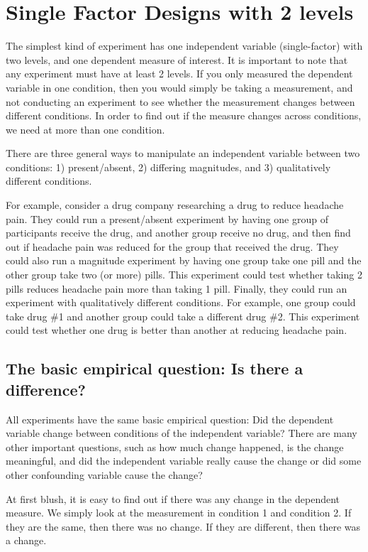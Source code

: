 \section{Single Factor Designs with 2 levels}

The simplest kind of experiment has one independent variable (single-factor) with two levels, and one dependent measure of interest. It is important to note that any experiment must have at least 2 levels. If you only measured the dependent variable in one condition, then you would simply be taking a measurement, and not conducting an experiment to see whether the measurement changes between different conditions. In order to find out if the measure changes across conditions, we need at more than one condition.

There are three general ways to manipulate an independent variable between two conditions: 1) present/absent, 2) differing magnitudes, and 3) qualitatively different conditions.

For example, consider a drug company researching a drug to reduce headache pain. They could run a present/absent experiment by having one group of participants receive the drug, and another group receive no drug, and then find out if headache pain was reduced for the group that received the drug. They could also run a magnitude experiment by having one group take one pill and the other group take two (or more) pills. This experiment could test whether taking 2 pills reduces headache pain more than taking 1 pill. Finally, they could run an experiment with qualitatively different conditions. For example, one group could take drug \#1 and another group could take a different drug \#2. This experiment could test whether one drug is better than another at reducing headache pain.

\subsection{The basic empirical question: Is there a difference?}

All experiments have the same basic empirical question: Did the dependent variable change between conditions of the independent variable? There are many other important questions, such as how much change happened, is the change meaningful, and did the independent variable really cause the change or did some other confounding variable cause the change?

At first blush, it is easy to find out if there was any change in the dependent measure. We simply look at the measurement in condition 1 and condition 2. If they are the same, then there was no change. If they are different, then there was a change.

